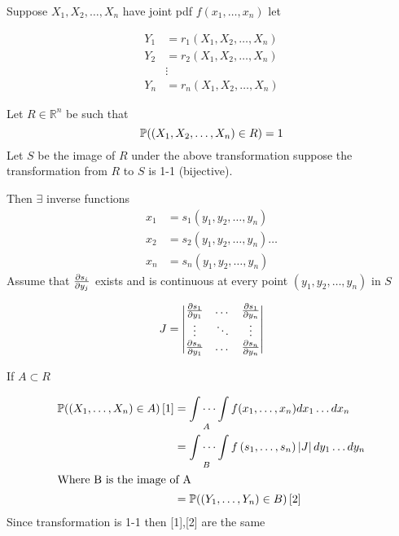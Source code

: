 \documentclass{notes}
\theoremstyle{plain}
\newcommand{\bP}{\mathbb{P}}
\newcommand{\bR}{\mathbb{R}}
\newcommand{\prob}[1]{\bP \negthinspace\left(#1\right)}
\begin{document}
Suppose $ X_1,X_2,\dots, X_n$ have joint pdf $f(x_1,\dots,x_n)$ let

\begin{align*}
Y_1 &= r_1 (X_1,X_2,\dots, X_n)\\
Y_2 &= r_2 (X_1,X_2,\dots, X_n)\\
&\vdots \\
Y_n &= r_n (X_1,X_2,\dots, X_n)
\end{align*}

Let $ R \in \bR^n$ be such that
\[
\prob{(X_1,X_2,\dots, X_n) \in R} = 1
\]
Let $S$ be the image of $R$ under the above transformation suppose the
transformation from $R$ to $S$ is 1-1 (bijective).

\vspace{3in}

Then $\exists$ inverse functions
\begin{align*}
x_1 &= s_1 (y_1,y_2,\dots, y_n)\\
x_2 &= s_2 (y_1,y_2,\dots, y_n)\dots\\
x_n &= s_n (y_1,y_2,\dots, y_n)
\end{align*} 
Assume that $\frac{\partial s_i}{\partial y_j} $ exists and is continuous
at every point $(y_1,y_2,\dots, y_n)$ in $S$

\begin{equation}
J=
\begin{vmatrix}
\frac{\partial s_1}{\partial y_1} &\dots & \frac{\partial s_1}{\partial y_n}\\
\vdots & \ddots & \vdots\\
\frac{\partial s_n}{\partial y_1}&\dots & \frac{\partial s_n}{\partial y_n}
\end{vmatrix}
\end{equation}

If $ A \subset R $

\begin{align*}
\prob{(X_1,\dots ,X_n) \in A}[1] &= \idotsint\limits_A
f(x_1,\dots,x_n)dx_1\dots dx_n\\
&= \idotsint\limits_B f\left(s_1,\dots,s_n\right)\abs{J}dy_1\dots dy_n\\
\intertext{Where B is the image of A}
&=\prob{(Y_1,\dots,Y_n) \in B}[2]\\
\end{align*}
Since transformation is 1-1 then [1],[2] are the same
\end{document}

